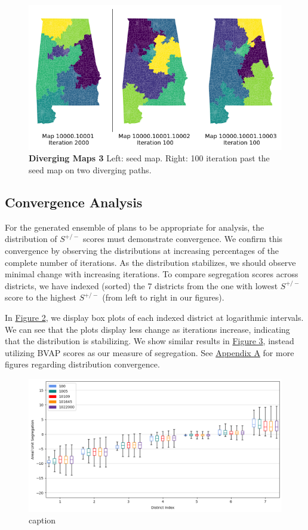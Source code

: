 \documentclass{article}
\begin{document}
\begin{figure}[h]\label{diverge 100}
    \centering
    \includegraphics[scale=.8]{images/maps_100.png}
    \caption{\textbf{Diverging Maps 3} Left: seed map. Right: 100 iteration past the seed map on two diverging paths.}
\end{figure}

\clearpage

\subsection{Convergence Analysis}\label{convergence}

For the generated ensemble of plans to be appropriate for analysis, the distribution of $S^{+/-}$ scores must demonstrate convergence. We confirm this convergence by observing the distributions at increasing percentages of the complete number of iterations. As the distribution stabilizes, we should observe minimal change with increasing iterations. To compare segregation scores across districts, we have indexed (sorted) the 7 districts from the one with lowest $S^{+/-}$ score to the highest $S^{+/-}$ (from left to right in our figures).
\par
In \hyperref[fig 2]{Figure 2}, we display box plots of each indexed district at logarithmic intervals. We can see that the plots display less change as iterations increase, indicating that the distribution is stabilizing. We show similar results in \hyperref[fig 3]{Figure 3}, instead utilizing BVAP scores as our measure of segregation. See \hyperref[convergence appendix]{Appendix A} for more figures regarding distribution convergence.
\
\begin{figure}[h]\label{fig 2}
    \centering
    \includegraphics[scale=.5]{images/asu_bxp_convergence.png}
    \caption{caption}
\end{figure}
\end{document}
